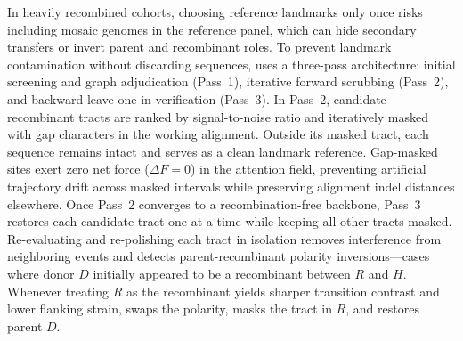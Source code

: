 In heavily recombined cohorts, choosing reference landmarks only once risks including mosaic genomes in the reference panel, which can hide secondary transfers or invert parent and recombinant roles. To prevent landmark contamination without discarding sequences, \RhizAeon uses a three-pass architecture: initial screening and graph adjudication (Pass~1), iterative forward scrubbing (Pass~2), and backward leave-one-in verification (Pass~3). In Pass~2, candidate recombinant tracts are ranked by signal-to-noise ratio and iteratively masked with gap characters in the working alignment. Outside its masked tract, each sequence remains intact and serves as a clean landmark reference. Gap-masked sites exert zero net force ($\Delta F = 0$) in the attention field, preventing artificial trajectory drift across masked intervals while preserving alignment indel distances elsewhere. Once Pass~2 converges to a recombination-free backbone, Pass~3 restores each candidate tract one at a time while keeping all other tracts masked. Re-evaluating and re-polishing each tract in isolation removes interference from neighboring events and detects parent-recombinant polarity inversions—cases where donor $D$ initially appeared to be a recombinant between $R$ and $H$. Whenever treating $R$ as the recombinant yields sharper transition contrast and lower flanking strain, \RhizAeon swaps the polarity, masks the tract in $R$, and restores parent $D$.

